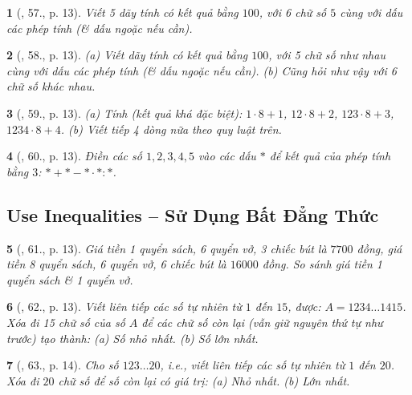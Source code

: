 \documentclass{article}
\newtheorem{baitoan}{}
\begin{document}
\begin{baitoan}[\cite{Binh_Toan_6_tap_1}, 57., p. 13]
	Viết 5 dãy tính có kết quả bằng $100$, với 6 chữ số $5$ cùng với dấu các phép tính (\& dấu ngoặc nếu cần).
\end{baitoan}

\begin{baitoan}[\cite{Binh_Toan_6_tap_1}, 58., p. 13]
	(a) Viết dãy tính có kết quả bằng $100$, với 5 chữ số như nhau cùng với dấu các phép tính (\& dấu ngoặc nếu cần). (b) Cũng hỏi như vậy với 6 chữ số khác nhau.
\end{baitoan}

\begin{baitoan}[\cite{Binh_Toan_6_tap_1}, 59., p. 13]
	(a) Tính (kết quả khá đặc biệt): $1\cdot8 + 1$, $12\cdot8 + 2$, $123\cdot8 + 3$, $1234\cdot8 + 4$. (b) Viết tiếp 4 dòng nữa theo quy luật trên.
\end{baitoan}

\begin{baitoan}[\cite{Binh_Toan_6_tap_1}, 60., p. 13]
	Điền các số $1,2,3,4,5$ vào các dấu $*$ để kết quả của phép tính bằng $3$: $*+*-*\cdot*:*$.
\end{baitoan}

\subsection{Use Inequalities -- Sử Dụng Bất Đẳng Thức}

\begin{baitoan}[\cite{Binh_Toan_6_tap_1}, 61., p. 13]
	Giá tiền 1 quyển sách, 6 quyển vở, 3 chiếc bút là $7700$ đồng, giá tiền 8 quyển sách, 6 quyển vở, 6 chiếc bút là $16000$ đồng. So sánh giá tiền 1 quyển sách \& 1 quyển vở.
\end{baitoan}

\begin{baitoan}[\cite{Binh_Toan_6_tap_1}, 62., p. 13]
	Viết liên tiếp các số tự nhiên từ $1$ đến $15$, được: $A = 1234\ldots1415$. Xóa đi 15 chữ số của số $A$ để các chữ số còn lại (vẫn giữ nguyên thứ tự như trước) tạo thành: (a) Số nhỏ nhất. (b) Số lớn nhất.
\end{baitoan}

\begin{baitoan}[\cite{Binh_Toan_6_tap_1}, 63., p. 14]
	Cho số $123\ldots20$, i.e., viết liên tiếp các số tự nhiên từ $1$ đến $20$. Xóa đi $20$ chữ số để số còn lại có giá trị: (a) Nhỏ nhất. (b) Lớn nhất.
\end{baitoan}
\end{document}
